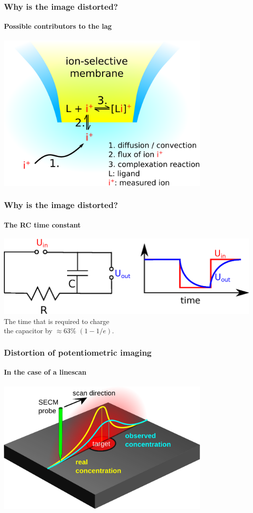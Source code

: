 \documentclass{beamer}
\begin{document}
\begin{frame}
\frametitle{Why is the image distorted?}
\framesubtitle{Possible contributors to the lag}
\centering
\includegraphics[width=0.8\textwidth]{npp.eps}
\end{frame}

\begin{frame}
	\frametitle{Why is the image distorted?}
	\framesubtitle{The RC time constant} 
	\centering
	\includegraphics[width=1\textwidth]{RC.eps}
	\vfill
	The time that is required to charge \\ the capacitor by $\approx 63\%$ $(1-1/e)$.	
%	
%	
%	

\end{frame}

\begin{frame}
	\frametitle{Distortion of potentiometric imaging} 
	\framesubtitle{In the case of a linescan} 
	\centering
	\includegraphics[width=0.8\textwidth]{distortion2.eps}
\end{frame}
\end{document}
